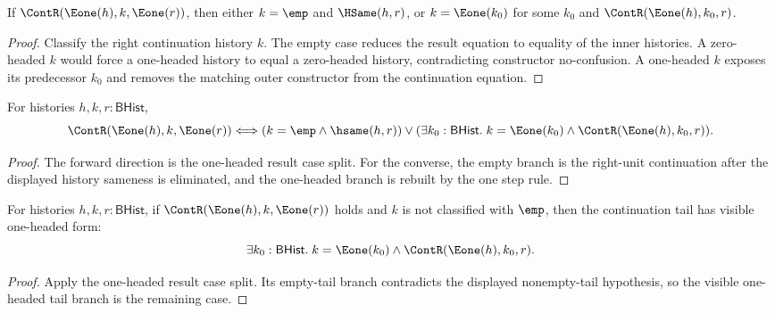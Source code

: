 \begin{theorem}
\label{thm:cont-left-e1-result-cases}
If $\ContR(\Eone(h),k,\Eone(r))$, then either $k=\emp$ and
$\HSame(h,r)$, or $k=\Eone(k_0)$ for some $k_0$ and
$\ContR(\Eone(h),k_0,r)$.
\end{theorem}
\begin{proof}
Classify the right continuation history $k$. The empty case reduces the result
equation to equality of the inner histories. A zero-headed $k$ would force a
one-headed history to equal a zero-headed history, contradicting constructor
no-confusion. A one-headed $k$ exposes its predecessor $k_0$ and removes the
matching outer constructor from the continuation equation.
\end{proof}

\begin{theorem}
\label{thm:cont-left-e1-result-iff}
For histories $h,k,r:\mathsf{BHist}$,
$$
\ContR(\Eone(h),k,\Eone(r))
\Longleftrightarrow
(k=\emp\land \hsame(h,r))
\lor
(\exists k_0:\mathsf{BHist}.\; k=\Eone(k_0)\land
\ContR(\Eone(h),k_0,r)).
$$
\end{theorem}
\begin{proof}
The forward direction is the one-headed result case split. For the converse,
the empty branch is the right-unit continuation after the displayed history
sameness is eliminated, and the one-headed branch is rebuilt by the one step
rule.
\end{proof}

\begin{proposition}
\label{prop:cont-left-e1-result-nonempty-tail-cases}
For histories $h,k,r:\mathsf{BHist}$, if
$\ContR(\Eone(h),k,\Eone(r))$ holds and $k$ is not classified with $\emp$,
then the continuation tail has visible one-headed form:
$$
\exists k_0:\mathsf{BHist}.\;
k=\Eone(k_0)\land \ContR(\Eone(h),k_0,r).
$$
\end{proposition}
\begin{proof}
Apply the one-headed result case split. Its empty-tail branch contradicts the
displayed nonempty-tail hypothesis, so the visible one-headed tail branch is
the remaining case.
\end{proof}

